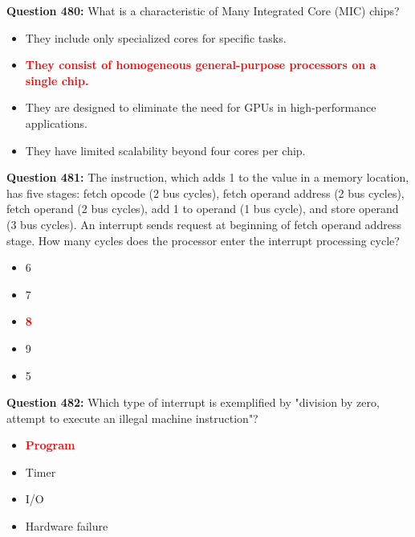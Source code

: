 \documentclass[12pt,a4paper]{article}
\begin{document}
\textbf{Question 480:} What is a characteristic of Many Integrated Core (MIC) chips?

\begin{itemize}
    \item[\textbf{A.}] They include only specialized cores for specific tasks.
    \item[\textbf{B.}] \textcolor{red}{\textbf{They consist of homogeneous general-purpose processors on a single chip.}}
    \item[\textbf{C.}] They are designed to eliminate the need for GPUs in high-performance applications.
    \item[\textbf{D.}] They have limited scalability beyond four cores per chip.
\end{itemize}

\vspace{0.5cm}

\textbf{Question 481:} The instruction, which adds 1 to the value in a memory location, has five stages: fetch opcode (2 bus cycles), fetch operand address (2 bus cycles), fetch operand (2 bus cycles), add 1 to operand (1 bus cycle), and store operand (3 bus cycles). An interrupt sends request at beginning of fetch operand address stage. How many cycles does the processor enter the interrupt processing cycle?

\begin{itemize}
    \item[\textbf{A.}] 6
    \item[\textbf{B.}] 7
    \item[\textbf{C.}] \textcolor{red}{\textbf{8}}
    \item[\textbf{D.}] 9
    \item[\textbf{E.}] 5
\end{itemize}

\vspace{0.5cm}

\textbf{Question 482:} Which type of interrupt is exemplified by "division by zero, attempt to execute an illegal machine instruction"?

\begin{itemize}
    \item[\textbf{A.}] \textcolor{red}{\textbf{Program}}
    \item[\textbf{B.}] Timer
    \item[\textbf{C.}] I/O
    \item[\textbf{D.}] Hardware failure
\end{itemize}
\end{document}
